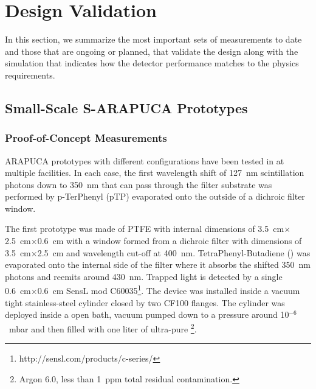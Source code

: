 \section{Design Validation}
\label{sec:fdsp-pd-validation}


In this section, we summarize the most important sets of measurements to date and those that are ongoing or planned, that validate the  design along with the  simulation that indicates how the detector performance matches to the physics requirements.


\subsection{Small-Scale S-ARAPUCA Prototypes}


\subsubsection{Proof-of-Concept Measurements}
\label{sec:proof-principle}

ARAPUCA prototypes with different configurations have been tested in \lar at multiple facilities. In each case, the first wavelength shift of \SI{127}{nm} scintillation photons down to \SI{350}{nm} that can pass through the filter substrate was performed by p-TerPhenyl (pTP) evaporated onto the outside of a dichroic filter window. 

The first prototype was made of PTFE with internal dimensions of \SI{3.5}{cm}$\times$\SI{2.5}{cm}$\times$\SI{0.6}{cm} with a window formed from a dichroic filter with dimensions of \SI{3.5}{cm}$\times$\SI{2.5}{cm} and wavelength cut-off at \SI{400}{nm}. 
TetraPhenyl-Butadiene () was evaporated onto the internal side of the filter where it absorbs the shifted \SI{350}{nm} photons and reemits around \SI{430}{nm}. Trapped light is detected by a single \SI{0.6}{cm}$\times$\SI{0.6}{cm} SensL  mod C60035\footnote{http://sensl.com/products/c-series/}.
The device was installed inside a vacuum tight stainless-steel cylinder closed by two CF100 flanges. The cylinder was deployed inside a \lar open bath, vacuum pumped down to a pressure around  10$^{-6}$~\si{mbar} and then filled with one liter of ultra-pure \lar\footnote{Argon 6.0, less than \SI{1}{ppm} total residual contamination.}.

